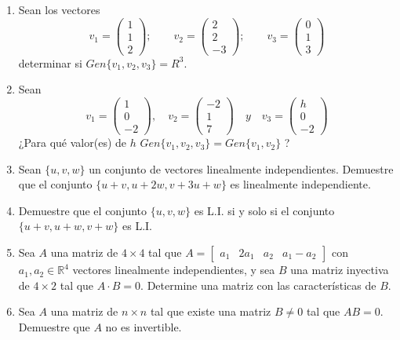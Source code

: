 \documentclass[12pt]{article}
\newenvironment{preguntas}
{\begin{enumerate}\itemsep12pt
	}
	{
	\end{enumerate}
}
\newcommand{\R}{\mathbb{R}}
\begin{document}
\begin{preguntas}
$$\begin{bmatrix}
	a & 2a & 0 & a
	\end{bmatrix}$$
	sea invertible
\item Sean los vectores 
	$$
	v_1 = \begin{pmatrix}
	1\\
	1\\
	2
	\end{pmatrix};\qquad
	v_2 = \begin{pmatrix}
	2\\
	2\\
	-3
	\end{pmatrix}; \qquad
	v_3 = \begin{pmatrix}
	0\\
	1\\
	3
	\end{pmatrix}$$
	determinar si $Gen\{v_1, v_2, v_3\} = R^3$.
\item Sean 
$$v_1=\left(\begin{array}{r}
  1\\0\\-2
\end{array}\right), \quad v_2=\left(\begin{array}{r}
  -2\\1\\7
\end{array}\right) \quad y \quad v_3=\left(\begin{array}{r}
  h\\0\\-2
\end{array}\right)$$
¿Para qué valor(es) de $h$ $Gen\{v_1, v_2, v_3\}=Gen\{v_1,v_2\}$ ?
\item Sean $\{u, v, w\}$ un conjunto de vectores linealmente independientes. Demuestre que el conjunto $\{u+v, u+2w, v+3u+w\}$ es linealmente independiente.
\item Demuestre que el conjunto $\{u, v, w\}$ es L.I. si y solo si el conjunto $\{u+v, u+w, v+w\}$ es L.I.
\item Sea $A$ una matriz de $4 \times 4$ tal que $A=\begin{bmatrix}a_1 & 2a_1 & a_2 & a_1-a_2\end{bmatrix}$ con $a_1, a_2 \in \R^4$ vectores linealmente independientes, y sea $B$ una matriz inyectiva de $4 \times 2$ tal que $A \cdot B = 0$. Determine una matriz con las características de $B$.
\item Sea $A$ una matriz de $n \times n$ tal que existe una matriz $B \neq 0$ tal que $AB = 0$.\\
Demuestre que $A$ no es invertible.

\end{preguntas}
\end{document}
